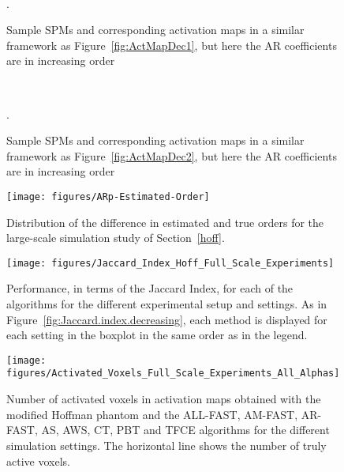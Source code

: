     \begin{figure}
      \mbox{
      }
      \mbox{
      }
    \mbox{
      }
    \caption{Sample SPMs and corresponding activation maps in a similar framework as
      Figure~\ref{fig:ActMapDec1}, but here the AR coefficients are in
      increasing order}.
    \label{fig:ActMapInc1}
    \end{figure}
    \begin{figure}
     \mbox{
      }
    \mbox{
      }
    \mbox{
      }
    \caption{Sample SPMs and corresponding activation maps in a similar framework as
      Figure~\ref{fig:ActMapDec2}, but here the AR coefficients are in
      increasing order}.\label{fig:ActMapInc2}
    \end{figure}
\begin{figure}
\texttt{[image: figures/ARp-Estimated-Order]}
\caption{Distribution of the difference in estimated and true orders
  for the large-scale simulation study of Section~\ref{hoff}.}
  \label{fig:ARp.estimated.order}
\end{figure}
\begin{figure}
\begin{center}
\texttt{[image: figures/Jaccard\_Index\_Hoff\_Full\_Scale\_Experiments]}
\caption[JaccardIndex]{Performance, in terms of the Jaccard Index, for
  each of the algorithms for the different experimental setup and
  settings. As in Figure~\ref{fig:Jaccard.index.decreasing}, each
  method is displayed for each setting in the boxplot in the same
  order as in the legend.} 
  \label{fig:Jaccard.complete}
\end{center}
\end{figure}
\begin{figure}
\begin{center}
\texttt{[image: figures/Activated\_Voxels\_Full\_Scale\_Experiments\_All\_Alphas]}
\caption{Number of activated voxels in activation maps obtained
  with the modified Hoffman phantom and the ALL-FAST, AM-FAST, AR-FAST, AS, AWS,
  CT, PBT and TFCE algorithms 
  for the different simulation settings. The horizontal line shows
  the number of truly active voxels.}
  \label{fig:ActivatedVoxels.complete}
\end{center}
\end{figure}
